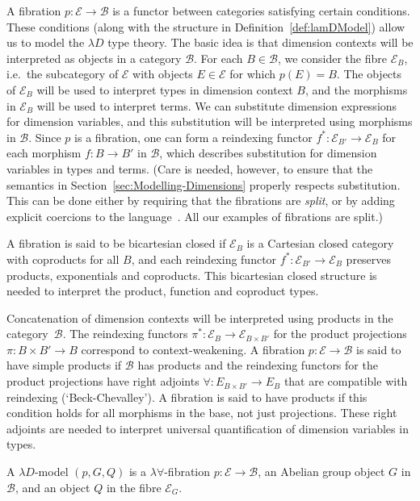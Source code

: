 \documentclass[a4paper,UKenglish]{lipics}
\theoremstyle{plain}
\newcommand{\B}{\mathcal{B}}
\newcommand{\E}{\mathcal{E}}
\newcommand{\fibreE}[1]{\E_{#1}}
\begin{document}
A fibration $p:\E\to\B$ is a functor between categories satisfying certain conditions. These conditions (along with the structure in Definition~\ref{def:lamDModel}) allow us to model the $\lambda D$ type theory. The basic idea is that dimension contexts will be interpreted as objects in a category $\B$. For each $B\in\B$, we consider the fibre $\E_B$, i.e.\ the subcategory of $\E$ with objects $E \in \E$ for which $p(E)=B$. The objects of $\E_B$ will be used to interpret types in dimension context $B$, and the morphisms in $\E_B$ will be used to interpret terms. We can substitute dimension expressions for dimension variables, and this substitution will be interpreted using morphisms in $\B$.  Since $p$ is a fibration, one can form a reindexing functor $f^\ast : \E_{B'}\to \E_B$ for each morphism $f:B\to B'$ in $\B$, which describes substitution for dimension variables in types and terms. (Care is needed, however, to ensure that the semantics in Section~\ref{sec:Modelling-Dimensions} properly respects substitution. This can be done either by requiring that the fibrations are \emph{split}, or by adding explicit coercions to the language~\cite{curien-garner-hofmann}. All our examples of fibrations are split.)

A fibration is said to be bicartesian closed if $\E_B$ is a Cartesian closed category with coproducts for all $B$, and each reindexing functor $f^*:\E_{B'}\to\E_B$ preserves products, exponentials and coproducts. This bicartesian closed structure is needed to interpret the product, function and coproduct types.

Concatenation of dimension contexts will be interpreted using products in the category~$\B$. The reindexing functors  $\pi^\ast:\E_{B}\to \E_{B\times B'}$ for the product projections $\pi:B\times B'\to B$ correspond to context-weakening. A fibration $p:\E\to \B$ is said to have simple products if $\B$ has products and the reindexing functors for the product projections have right adjoints $\forall:E_{B\times B'}\to E_B$ that are compatible with reindexing (`Beck-Chevalley'). A fibration is said to have products if this condition holds for all morphisms in the base, not just projections. These right adjoints are needed to interpret universal quantification of dimension variables in types.

\begin{definition}\label{def:lamDModel}
A $\lambda D$-model $(p,G, Q)$ is a $\lambda \forall$-fibration $p:\E\to \B$, an Abelian group object $G$ in $\B$, and an object $Q$ in the fibre $\fibreE{G}$.
\end{definition}
\end{document}
